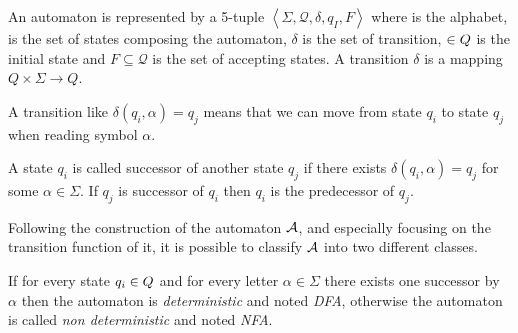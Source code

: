 


\begin{definition}[Automaton]
  An automaton \automaton{} is represented by a 5-tuple $\left\langle \Sigma, \mathcal{Q}, \delta, q_I, F\right\rangle $ where \alphabet{} is the alphabet, \states{} is the set of states composing the automaton, $\delta$ is the set of transition, \qzero{} $\in Q{}$ is the initial state and $F \subseteq \mathcal{Q}$ is the set of accepting states. A transition $\delta$ is a mapping $Q \times \Sigma \rightarrow Q$.
\end{definition}

\begin{example}
  A transition like $\delta(q_i, \alpha) = q_j$ means that we can move from state $q_i$ to state $q_j$ when reading symbol $\alpha$.
\end{example}

A state $q_i$ is called successor of another state $q_j$ if there exists $\delta(q_i, \alpha) = q_j$ for some $\alpha \in \Sigma$. If $q_j$ is successor of $q_i$ then $q_i$ is the predecessor of $q_j$.

Following the construction of the automaton $\mathcal{A}$, and especially focusing on the transition function of it, it is possible to classify $\mathcal{A}$ into two different classes.

\begin{definition}
  If for every state $q_i \in Q{}$ and for every letter $\alpha \in \Sigma$ there exists one successor by $\alpha$ then the automaton is \textit{deterministic} and noted \textit{DFA}, otherwise the automaton is called \textit{non deterministic} and noted \textit{NFA}.
\end{definition}

